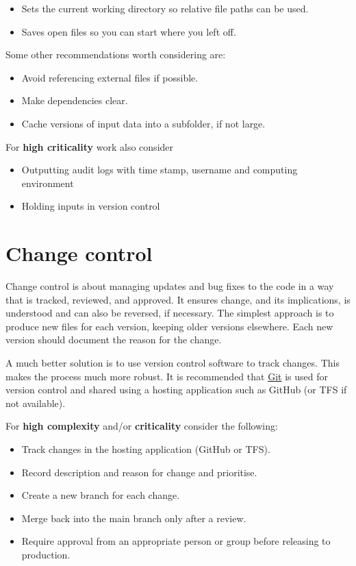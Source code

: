 \documentclass[]{book}
\providecommand{\tightlist}{%
  \setlength{\itemsep}{0pt}\setlength{\parskip}{0pt}}
\theoremstyle{definition}
\theoremstyle{definition}
\theoremstyle{definition}
\theoremstyle{remark}
\begin{document}
\begin{itemize}
\tightlist
\item
  Sets the current working directory so relative file paths can be used.
\item
  Saves open files so you can start where you left off.
\end{itemize}

Some other recommendations worth considering are:

\begin{itemize}
\tightlist
\item
  Avoid referencing external files if possible.
\item
  Make dependencies clear.
\item
  Cache versions of input data into a subfolder, if not large.
\end{itemize}

For \textbf{high criticality} work also consider

\begin{itemize}
\tightlist
\item
  Outputting audit logs with time stamp, username and computing
  environment
\item
  Holding inputs in version control
\end{itemize}

\section{Change control}\label{change-control}

Change control is about managing updates and bug fixes to the code in a
way that is tracked, reviewed, and approved. It ensures change, and its
implications, is understood and can also be reversed, if necessary. The
simplest approach is to produce new files for each version, keeping
older versions elsewhere. Each new version should document the reason
for the change.

A much better solution is to use version control software to track
changes. This makes the process much more robust. It is recommended that
\href{development.html\#git}{Git} is used for version control and shared
using a hosting application such as GitHub (or TFS if not available).

For \textbf{high complexity} and/or \textbf{criticality} consider the
following:

\begin{itemize}
\tightlist
\item
  Track changes in the hosting application (GitHub or TFS).
\item
  Record description and reason for change and prioritise.
\item
  Create a new branch for each change.
\item
  Merge back into the main branch only after a review.
\item
  Require approval from an appropriate person or group before releasing
  to production.
\end{itemize}
\end{document}
